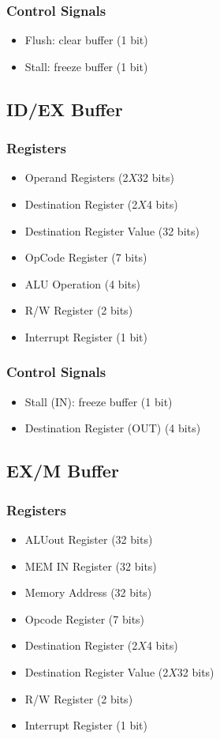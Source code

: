 \subsubsection{Control Signals}
\begin{itemize}
    \item Flush: clear buffer (1 bit)
    \item Stall: freeze buffer (1 bit)
\end{itemize}

\subsection{ID/EX Buffer}
\subsubsection{Registers}
\begin{itemize}
    \item Operand Registers (2$X$32 bits)
    \item Destination Register (2$X$4 bits)
    \item Destination Register Value (32 bits)
    \item OpCode Register (7 bits)
    \item ALU Operation (4 bits)
    \item R/W Register (2 bits)
    \item Interrupt Register (1 bit)
\end{itemize}

\subsubsection{Control Signals}
\begin{itemize}
    \item Stall (IN): freeze buffer (1 bit)
    \item Destination Register (OUT) (4 bits)
\end{itemize}

\subsection{EX/M Buffer}
\subsubsection{Registers}
\begin{itemize}
    \item ALUout Register (32 bits)
    \item MEM IN Register (32 bits)
    \item Memory Address (32 bits)
    \item Opcode Register (7 bits)
    \item Destination Register (2$X$4 bits)
    \item Destination Register Value (2$X$32 bits)
    \item R/W Register (2 bits)
    \item Interrupt Register (1 bit)
\end{itemize}

